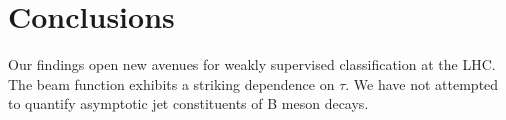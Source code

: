\section{Conclusions}\label{sec:conclusions}

Our findings open new avenues for weakly supervised classification at
the LHC. The beam function exhibits a striking dependence on $\tau$. We
have not attempted to quantify asymptotic jet constituents of B meson
decays.

